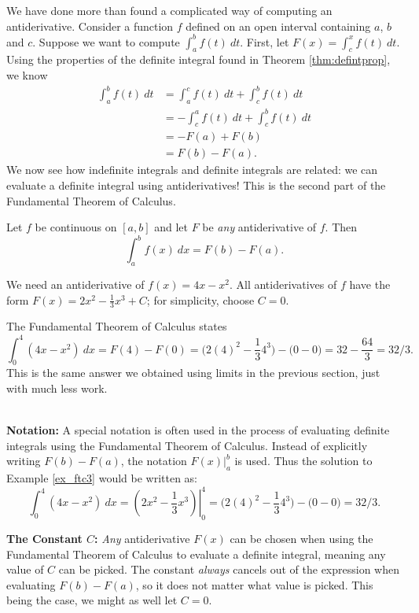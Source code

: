 We have done more than found a complicated way of computing an antiderivative. Consider a function $f$ defined on an open interval containing $a$, $b$ and $c$. Suppose we want to compute $\int_a^b f(t)\ dt$. First, let $F(x) = \int_c^x f(t)\ dt$. Using the properties of the definite integral found in Theorem \ref{thm:defintprop}, we know 
		\begin{align*}\int_a^b f(t)\ dt &= \int_a^c f(t)\ dt + \int_c^b f(t)\ dt \\
											&= -\int_c^a f(t)\ dt + \int_c^b f(t)\ dt \\
											&=-F(a) + F(b)\\
											&= F(b) - F(a).
		\end{align*}
We now see how indefinite integrals and definite integrals are related: we can evaluate a definite integral using antiderivatives! This is the second part of the Fundamental Theorem of Calculus.

{Let $f$ be continuous on $[a,b]$ and let $F$ be \textit{any} antiderivative of $f$. Then 
\[
\int_a^b f(x)\ dx = F(b) - F(a).
\]
}

{We need an antiderivative of $f(x)=4x-x^2$. All antiderivatives of $f$ have the form $F(x) = 2x^2-\frac13x^3+C$; for simplicity, choose $C=0$.

The Fundamental Theorem of Calculus states 
		\[
		\int_0^4(4x-x^2)\ dx = F(4)-F(0) = \big(2(4)^2-\frac134^3\big)-\big(0-0\big) = 32-\frac{64}3 = 32/3.
		\]
This is the same answer we obtained using limits in the previous section, just with much less work.
}\\

\noindent\textbf{Notation:} A special notation is often used in the process of evaluating definite integrals using the Fundamental Theorem of Calculus. Instead of explicitly writing $F(b)-F(a)$, the notation $F(x)\Big|_a^b$ is used. Thus the solution to Example \ref{ex_ftc3} would be written as:
	\[
	\int_0^4(4x-x^2)\ dx = \left.\left(2x^2-\frac13x^3\right)\right|_0^4 = \big(2(4)^2-\frac134^3\big)-\big(0-0\big) =  32/3.
	\]

\noindent\textbf{The Constant $C$:} \textit{Any} antiderivative $F(x)$ can be chosen when using the Fundamental Theorem of Calculus to evaluate a definite integral, meaning any value of $C$ can be picked. The constant \textit{always} cancels out of the expression when evaluating $F(b)-F(a)$, so it does not matter what value is picked. This being the case, we might as well let $C=0$.\\

